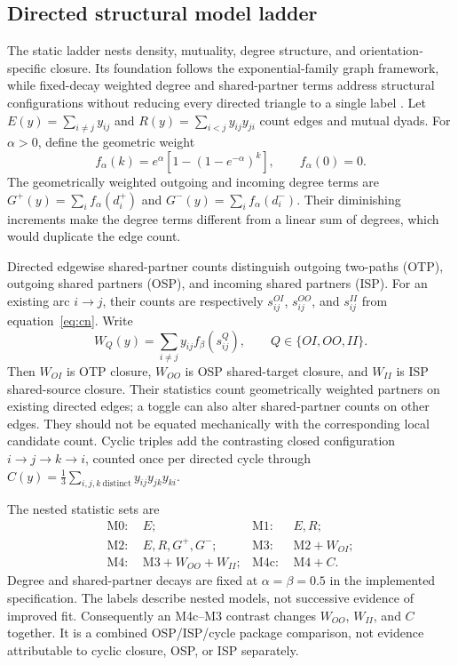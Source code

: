 \documentclass[10pt]{article}
\begin{document}
\subsection{Directed structural model ladder}
The static ladder nests density, mutuality, degree structure, and orientation-specific closure. Its foundation follows the exponential-family graph framework, while fixed-decay weighted degree and shared-partner terms address structural configurations without reducing every directed triangle to a single label \citep{snijdersEtAl2006,robinsEtAl2009}. Let $E(y)=\sum_{i\ne j}y_{ij}$ and $R(y)=\sum_{i<j}y_{ij}y_{ji}$ count edges and mutual dyads. For $\alpha>0$, define the geometric weight
\begin{equation}
f_\alpha(k)=e^\alpha[1-(1-e^{-\alpha})^k],\qquad f_\alpha(0)=0.
\label{eq:geom}
\end{equation}
The geometrically weighted outgoing and incoming degree terms are $G^+(y)=\sum_i f_\alpha(d_i^+)$ and $G^-(y)=\sum_i f_\alpha(d_i^-)$. Their diminishing increments make the degree terms different from a linear sum of degrees, which would duplicate the edge count.

Directed edgewise shared-partner counts distinguish outgoing two-paths (OTP), outgoing shared partners (OSP), and incoming shared partners (ISP). For an existing arc $i\to j$, their counts are respectively $s^{OI}_{ij}$, $s^{OO}_{ij}$, and $s^{II}_{ij}$ from equation~\eqref{eq:cn}. Write
\begin{equation}
W_Q(y)=\sum_{i\ne j}y_{ij}f_\beta(s^Q_{ij}),\qquad
Q\in\{OI,OO,II\}.
\label{eq:gwesp}
\end{equation}
Then $W_{OI}$ is OTP closure, $W_{OO}$ is OSP shared-target closure, and $W_{II}$ is ISP shared-source closure. Their statistics count geometrically weighted partners on existing directed edges; a toggle can also alter shared-partner counts on other edges. They should not be equated mechanically with the corresponding local candidate count. Cyclic triples add the contrasting closed configuration $i\to j\to k\to i$, counted once per directed cycle through $C(y)=\frac13\sum_{i,j,k\ \mathrm{distinct}}y_{ij}y_{jk}y_{ki}$.

The nested statistic sets are
\begin{align}
\mathrm{M0}:&\ E; & \mathrm{M1}:&\ E,R;\\
\mathrm{M2}:&\ E,R,G^+,G^-; & \mathrm{M3}:&\ \mathrm{M2}+W_{OI};\\
\mathrm{M4}:&\ \mathrm{M3}+W_{OO}+W_{II}; & \mathrm{M4c}:&\ \mathrm{M4}+C.
\label{eq:ladder}
\end{align}
Degree and shared-partner decays are fixed at $\alpha=\beta=0.5$ in the implemented specification. The labels describe nested models, not successive evidence of improved fit. Consequently an M4c--M3 contrast changes $W_{OO}$, $W_{II}$, and $C$ together. It is a combined OSP/ISP/cycle package comparison, not evidence attributable to cyclic closure, OSP, or ISP separately.
\end{document}
